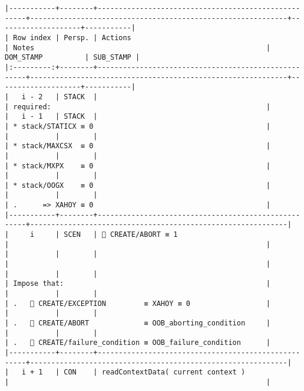 \documentclass[varwidth=\maxdimen,margin=0.5cm,multi={verbatim}]{standalone}
\begin{document}
\begin{verbatim}
|-----------+--------+-----------------------------------------------------+-------------------------------------------------------------+--------------------+-----------|
| Row index | Persp. | Actions                                             | Notes                                                       | DOM_STAMP          | SUB_STAMP |
|:---------:+--------+-----------------------------------------------------+-------------------------------------------------------------+--------------------+-----------|
|   i - 2   | STACK  |                                                     | required:                                                   |
|   i - 1   | STACK  |                                                     | * stack/STATICX ≡ 0                                         |
|           |        |                                                     | * stack/MAXCSX  ≡ 0                                         |
|           |        |                                                     | * stack/MXPX    ≡ 0                                         |
|           |        |                                                     | * stack/OOGX    ≡ 0                                         |
|           |        |                                                     | .      => XAHOY ≡ 0                                         |
|-----------+--------+-----------------------------------------------------+-------------------------------------------------------------|
|     i     | SCEN   |  CREATE/ABORT ≡ 1                                  |                                                             |
|           |        |                                                     |                                                             |
|           |        |                                                     | Impose that:                                                |
|           |        |                                                     | .    CREATE/EXCEPTION         ≡ XAHOY ≡ 0                  |
|           |        |                                                     | .    CREATE/ABORT             ≡ OOB_aborting_condition     |
|           |        |                                                     | .    CREATE/failure_condition ≡ OOB_failure_condition      |
|-----------+--------+-----------------------------------------------------+-------------------------------------------------------------|
|   i + 1   | CON    | readContextData( current context )                  |                                                             |

\end{verbatim}
\end{document}
